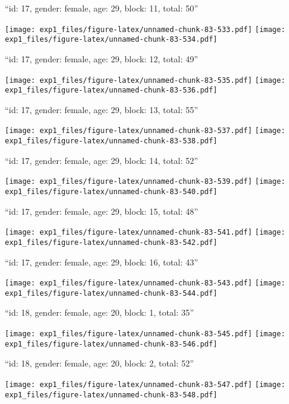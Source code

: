 \documentclass[11pt,,]{article}
\begin{document}
\newpage
[1] 

``id: 17, gender: female, age: 29, block: 11, total: 50''

\texttt{[image: exp1\_files/figure-latex/unnamed-chunk-83-533.pdf]}
\texttt{[image: exp1\_files/figure-latex/unnamed-chunk-83-534.pdf]}

\newpage
[1] 

``id: 17, gender: female, age: 29, block: 12, total: 49''

\texttt{[image: exp1\_files/figure-latex/unnamed-chunk-83-535.pdf]}
\texttt{[image: exp1\_files/figure-latex/unnamed-chunk-83-536.pdf]}

\newpage
[1] 

``id: 17, gender: female, age: 29, block: 13, total: 55''

\texttt{[image: exp1\_files/figure-latex/unnamed-chunk-83-537.pdf]}
\texttt{[image: exp1\_files/figure-latex/unnamed-chunk-83-538.pdf]}

\newpage
[1] 

``id: 17, gender: female, age: 29, block: 14, total: 52''

\texttt{[image: exp1\_files/figure-latex/unnamed-chunk-83-539.pdf]}
\texttt{[image: exp1\_files/figure-latex/unnamed-chunk-83-540.pdf]}

\newpage
[1] 

``id: 17, gender: female, age: 29, block: 15, total: 48''

\texttt{[image: exp1\_files/figure-latex/unnamed-chunk-83-541.pdf]}
\texttt{[image: exp1\_files/figure-latex/unnamed-chunk-83-542.pdf]}

\newpage
[1] 

``id: 17, gender: female, age: 29, block: 16, total: 43''

\texttt{[image: exp1\_files/figure-latex/unnamed-chunk-83-543.pdf]}
\texttt{[image: exp1\_files/figure-latex/unnamed-chunk-83-544.pdf]}

\newpage
[1] 

``id: 18, gender: female, age: 20, block: 1, total: 35''

\texttt{[image: exp1\_files/figure-latex/unnamed-chunk-83-545.pdf]}
\texttt{[image: exp1\_files/figure-latex/unnamed-chunk-83-546.pdf]}

\newpage
[1] 

``id: 18, gender: female, age: 20, block: 2, total: 52''

\texttt{[image: exp1\_files/figure-latex/unnamed-chunk-83-547.pdf]}
\texttt{[image: exp1\_files/figure-latex/unnamed-chunk-83-548.pdf]}
\end{document}
